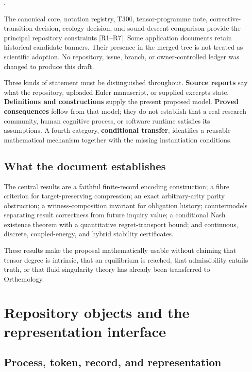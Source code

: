 \documentclass[11pt,a4paper]{article}
\begin{document}
.

The canonical core, notation registry, T300, tensor-programme note,
corrective-transition decision, ecology decision, and sound-descent
comparison provide the principal repository constraints {[}R1--R7{]}.
Some application documents retain historical candidate banners. Their
presence in the merged tree is not treated as scientific adoption. No
repository, issue, branch, or owner-controlled ledger was changed to
produce this draft.

Three kinds of statement must be distinguished throughout.
\textbf{Source reports} say what the repository, uploaded Euler
manuscript, or supplied excerpts state. \textbf{Definitions and
constructions} supply the present proposed model. \textbf{Proved
consequences} follow from that model; they do not establish that a real
research community, human cognitive process, or software runtime
satisfies its assumptions. A fourth category, \textbf{conditional
transfer}, identifies a reusable mathematical mechanism together with
the missing instantiation conditions.

\subsection{What the document
establishes}\label{what-the-document-establishes}

The central results are a faithful finite-record encoding construction;
a fibre criterion for target-preserving compression; an exact
arbitrary-arity parity obstruction; a witness-composition invariant for
obligation history; countermodels separating result correctness from
future inquiry value; a conditional Nash existence theorem with a
quantitative regret-transport bound; and continuous, discrete,
coupled-energy, and hybrid stability certificates.

These results make the proposal mathematically usable without claiming
that tensor degree is intrinsic, that an equilibrium is reached, that
admissibility entails truth, or that fluid singularity theory has
already been transferred to Orthemology.

\section{Repository objects and the representation
interface}\label{repository-objects-and-the-representation-interface}

\subsection{Process, token, record, and
representation}\label{process-token-record-and-representation}
\end{document}
